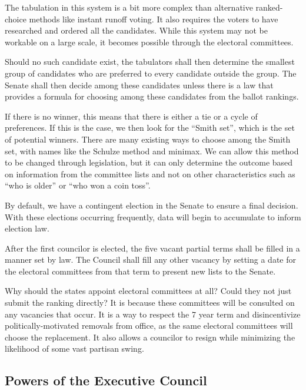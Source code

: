 \documentclass{article}
\newcommand{\quotes}[1]{``#1''}
\begin{document}
The tabulation in this system is a bit more complex than alternative ranked-choice methods like instant runoff voting. It also requires the voters to have researched and ordered all the candidates. While this system may not be workable on a large scale, it becomes possible through the electoral committees.

\begin{quoting}
Should no such candidate exist, the tabulators shall then determine the smallest group of candidates who are preferred to every candidate outside the group. The Senate shall then decide among these candidates unless there is a law that provides a formula for choosing among these candidates from the ballot rankings.
\end{quoting}

If there is no winner, this means that there is either a tie or a cycle of preferences. If this is the case, we then look for the \quotes{Smith set}\cite{Smith_Set}, which is the set of potential winners. There are many existing ways to choose among the Smith set, with names like the Schulze method\cite{Schulze} and minimax. We can allow this method to be changed through legislation, but it can only determine the outcome based on information from the committee lists and not on other characteristics such as \quotes{who is older} or \quotes{who won a coin toss}.

By default, we have a contingent election in the Senate to ensure a final decision. With these elections occurring frequently, data will begin to accumulate to inform election law.

\begin{quoting}
After the first councilor is elected, the five vacant partial terms shall be filled in a manner set by law. The Council shall fill any other vacancy by setting a date for the electoral committees from that term to present new lists to the Senate.
\end{quoting}

Why should the states appoint electoral committees at all? Could they not just submit the ranking directly? It is because these committees will be consulted on any vacancies that occur. It is a way to respect the 7 year term and disincentivize politically-motivated removals from office, as the same electoral committees will choose the replacement. It also allows a councilor to resign while minimizing the likelihood of some vast partisan swing.

\subsection{Powers of the Executive Council}
\end{document}
